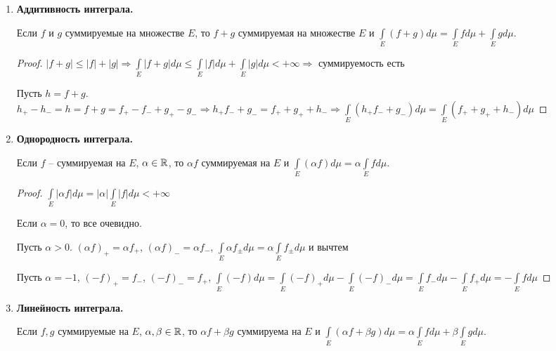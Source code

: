 \begin{enumerate}
\begin{proof}
        $\int\limits_E f_+ + \int\limits_E g_- = \int\limits_E (f_+ + g_-)d\mu \leq \int\limits_E (g_+ + f_-)d\mu=\int\limits_E g_+ + \int\limits_E f_-$
    \end{proof}

    \item \textbf{Аддитивность интеграла.}
    
    Если $f$ и $g$ суммируемые на множестве $E$, то $f+g$ суммируемая на множестве $E$ и 
    $\int\limits_E (f+g)d\mu = \int\limits_E f d\mu + \int\limits_E gd \mu$.

    \begin{proof}
        $|f+g|\leq |f|+|g|\Rightarrow \int\limits_E |f+g| d\mu \leq \int\limits_E |f| d\mu +
        \int\limits_E |g|d\mu < +\infty\Rightarrow$ суммируемость есть
        
        Пусть $h=f+g$. $h_+-h_-=h=f+g=f_+-f_-+g_+-g_-\Rightarrow
        h_+f_-+g_-=f_++g_++h_-\Rightarrow \int\limits_E(h_+f_-+g_-)d\mu = 
        \int\limits_E(f_++g_++h_-) d\mu$
    \end{proof}

    \item \textbf{Однородность интеграла.}
    
    Если $f$ – суммируемая на $E$, $\alpha\in \mathbb{R}$, то $\alpha f$ суммируемая на $E$ и
    $\int\limits_E (\alpha f) d\mu=\alpha\int\limits_E f d\mu$.

    \begin{proof}
        $\int\limits_E |\alpha f| d\mu=|\alpha|\int\limits_E |f| d\mu<+\infty$

        Если $\alpha =0$, то все очевидно. 

        Пусть $\alpha > 0$. $(\alpha f)_+= \alpha f_+$,  $(\alpha f)_-= \alpha f_-$, 
        $\int\limits_E \alpha f_\pm d\mu = \alpha \int\limits_E f_\pm d\mu$ и вычтем

        Пусть $\alpha =-1$, $(-f)_+=f_-$, $(-f)_-=f_+$,
        $\int\limits_E (-f)d\mu = \int\limits_E (-f)_+ d\mu - \int\limits_E (-f)_-d\mu =
        \int\limits_E f_- d\mu - \int\limits_E f_+ d\mu =-\int\limits_E f d\mu$
    \end{proof}

    \item \textbf{Линейность интеграла.}
    
    Если $f, g$ суммируемые на $E$, $\alpha, \beta\in \mathbb{R}$, то $\alpha f +\beta g$
    суммируема на $E$ и $\int\limits_E (\alpha f +\beta g)d\mu = \alpha\int\limits_E  fd\mu+\beta\int\limits_Eg d\mu$.


\end{enumerate}
